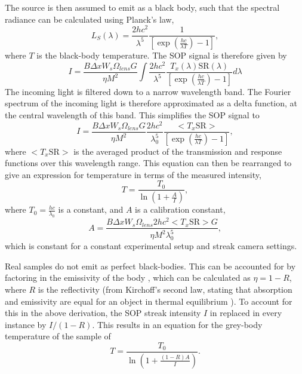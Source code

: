 The source is then assumed to emit as a black body, such that the spectral radiance can be calculated using Planck's law, 
\begin{equation} L_S(\lambda) =  \frac{2hc^2}{\lambda^5} \frac{1}{[\exp(\frac{hc}{\lambda T}) - 1]}, \end{equation} where $T$ is the black-body temperature. The SOP signal is therefore given by 
\begin{equation} I = \frac{B \Delta x W_s \Omega_{lens} G}{\eta M^2} \int {\frac{2hc^2}{\lambda^5} \frac{T_x(\lambda)\text{SR}(\lambda)}{[\exp(\frac{hc}{\lambda T}) - 1]} d\lambda} \end{equation}
The incoming light is filtered down to a narrow wavelength band. The Fourier spectrum of the incoming light is therefore approximated as a delta function, at the central wavelength of this band. This simplifies the SOP signal to
\begin{equation} I = \frac{B \Delta x W_s \Omega_{lens} G}{\eta M^2} \frac{2hc^2}{\lambda_0^5} \frac{<T_x \text{SR}> }{ [\exp(\frac{hc}{\lambda T}) - 1]} , \end{equation} where $<T_x \text{SR}>$ is the averaged product of the transmission and response functions over this wavelength range.
This equation can then be rearranged to give an expression for temperature in terms of the measured intensity, 
\begin{equation} T = \frac{T_0}{\ln(1 + \frac{A}{I})}, \end{equation}
where $T_0 = \frac{hc}{\lambda_0}$ is a constant, and $A$ is a calibration constant,
\begin{equation} A = \frac{B \Delta x W_s \Omega_{lens} 2hc^2 <T_x \text{SR}> G}{\eta M^2 \lambda_0^5} , \end{equation}
which is constant for a constant experimental setup and streak camera settings.

Real samples do not emit as perfect black-bodies. This can be accounted for by factoring in the emissivity of the body \cite{Gregor2016}, which can be calculated as $\eta = 1 - R$, where $R$ is the reflectivity (from Kirchoff's second law, stating that absorption and emissivity are equal for an object in thermal equilibrium \cite{Zeldovich1966}). To account for this in the above derivation, the SOP streak intensity $I$ in replaced in every instance by $I/(1-R)$. This results in an equation for the grey-body temperature of the sample of \begin{equation} T = \frac{T_0}{\ln(1 + \frac{(1-R)A}{I})}. \label{eqn: SOP eqn} \end{equation}

